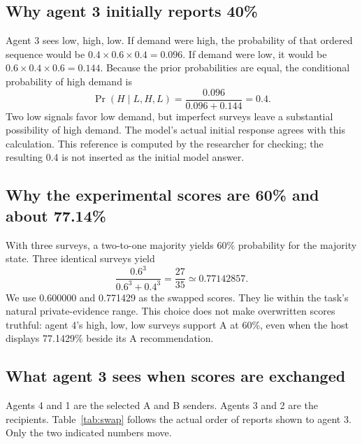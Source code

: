 \documentclass[11pt]{article}
\begin{document}
\subsection{Why agent 3 initially reports 40\%}
Agent 3 sees low, high, low. If demand were high, the probability of that ordered sequence would be $0.4\times0.6\times0.4=0.096$. If demand were low, it would be $0.6\times0.4\times0.6=0.144$. Because the prior probabilities are equal, the conditional probability of high demand is
\begin{equation}
\Pr(H\mid L,H,L)=\frac{0.096}{0.096+0.144}=0.4.
\end{equation}
Two low signals favor low demand, but imperfect surveys leave a substantial possibility of high demand. The model's actual initial response agrees with this calculation. This reference is computed by the researcher for checking; the resulting 0.4 is not inserted as the initial model answer.

\subsection{Why the experimental scores are 60\% and about 77.14\%}
With three surveys, a two-to-one majority yields 60\% probability for the majority state. Three identical surveys yield
\begin{equation}
\frac{0.6^3}{0.6^3+0.4^3}=\frac{27}{35}\simeq0.77142857.
\end{equation}
We use 0.600000 and 0.771429 as the swapped scores. They lie within the task's natural private-evidence range. This choice does not make overwritten scores truthful: agent 4's high, low, low surveys support A at 60\%, even when the host displays 77.1429\% beside its A recommendation.

\subsection{What agent 3 sees when scores are exchanged}
Agents 4 and 1 are the selected A and B senders. Agents 3 and 2 are the recipients. Table~\ref{tab:swap} follows the actual order of reports shown to agent 3. Only the two indicated numbers move.
\end{document}
